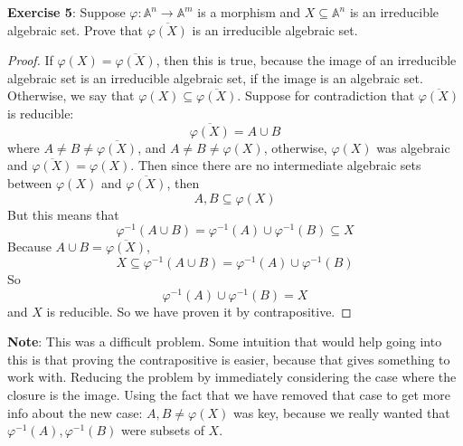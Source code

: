 \documentclass{article}
\begin{document}
\textbf{Exercise 5}: Suppose $\varphi : \mathbb{A}^{n} \rightarrow\mathbb{A}^{m}$ is a morphism and $X \subseteq \mathbb{A}^{n}$ is an irreducible algebraic set. Prove that $\overline{\varphi(X)}$ is an irreducible algebraic set.
    \begin{proof}
        If $\varphi(X) = \overline{\varphi(X)}$, then this is true, because the image of an irreducible algebraic set is an irreducible algebraic set, if the image is an algebraic set. Otherwise, we say that $\varphi(X) \subseteq \overline{\varphi(X)}$. Suppose for contradiction that $\overline{\varphi(X)}$ is reducible:
            \begin{equation*}
                \overline{\varphi(X)} = A \cup B
            \end{equation*}
        where $A \neq B \neq \overline{\varphi(X)}$, and $A \neq B \neq \varphi(X)$, otherwise, $\varphi(X)$ was algebraic and $\overline{\varphi(X)} = \varphi(X)$. Then since there are no intermediate algebraic sets between $\varphi(X)$ and $\overline{\varphi(X)}$, then 
            \begin{equation*}
                A, B \subseteq \varphi(X)
            \end{equation*}
        But this means that 
            \begin{equation*}
                \varphi^{-1}(A \cup B) = \varphi^{-1}(A) \cup \varphi^{-1}(B) \subseteq X
            \end{equation*}
        Because $A \cup B = \overline{\varphi(X)}$,
            \begin{equation*}
                X \subseteq \varphi^{-1}(A \cup B) = \varphi^{-1}(A) \cup \varphi^{-1}(B)
            \end{equation*}
        So
            \begin{equation*}
                \varphi^{-1}(A) \cup \varphi^{-1}(B) = X
            \end{equation*}
        and $X$ is reducible. So we have proven it by contrapositive.
    \end{proof}
\textbf{Note}: This was a difficult problem. Some intuition that would help going into this is that proving the contrapositive is easier, because that gives something to work with. Reducing the problem by immediately considering the case where the closure is the image. Using the fact that we have removed that case to get more info about the new case: $A, B \neq \varphi(X)$ was key, because we really wanted that $\varphi^{-1}(A), \varphi^{-1}(B)$ were subsets of $X$.
\end{document}
